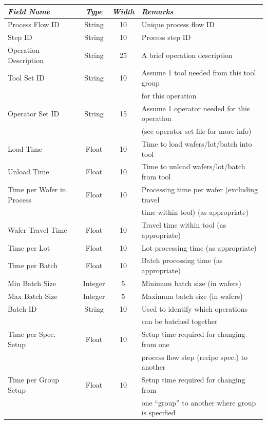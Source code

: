    \begin{center}
   \begin{tabular}{|l|c|c|l|}  \hline
   {\em Field Name} &  {\em Type} & {\em Width } & {\em Remarks} \\ \hline
   Process Flow ID  & String & 10 & Unique process flow ID \\
   Step ID & String & 10 & Process step ID \\
   Operation Description  & String & 25 & A brief operation description \\
   Tool Set ID & String & 10 & Assume
   1 tool needed from this tool group \\
    & & & for this operation \\
   Operator Set ID & String & 15 &  Assume 1 operator needed for this
   operation \\
    & & & (see operator set file for more info) \\
   Load Time & Float & 10 & Time to load wafers/lot/batch into tool \\
   Unload Time & Float & 10 & Time to unload wafers/lot/batch from tool \\
   Time per Wafer in Process & Float & 10 & Processing time per wafer (excluding 
   travel \\
    & & & time within tool) (as appropriate) \\
   Wafer Travel Time & Float & 10 & Travel time within tool (as appropriate)\\
   Time per Lot & Float & 10 & Lot processing time (as appropriate) \\
   Time per Batch & Float & 10 & Batch processing time (as appropriate) \\
   Min Batch Size & Integer & 5 & Minimum batch size (in wafers) \\
   Max Batch Size & Integer & 5 & Maximum batch size (in wafers) \\
   Batch ID & String & 10 & Used to identify which operations \\
    & & & can be batched together \\
   Time per Spec. Setup & Float & 10 & Setup time required for changing from one 
   \\
    & & &  process flow step (recipe spec.) to another \\
   Time per Group Setup & Float & 10 & Setup time required for changing
   from \\
    & & & one ``group'' to another where group is specified \\

\end{tabular}
\end{center}
